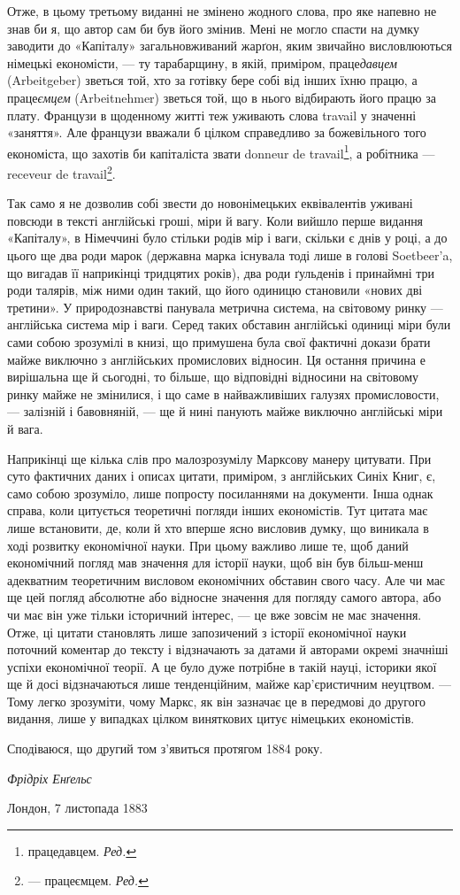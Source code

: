 Отже, в цьому третьому виданні не змінено жодного слова,
про яке напевно не знав би я, що автор сам би був його змінив.
Мені не могло спасти на думку заводити до «Капіталу» загальновживаний
жарґон, яким звичайно висловлюються німецькі економісти,
— ту тарабарщину, в якій, приміром, праце\emph{давцем} (Arbeitgeber)
зветься той, хто за готівку бере собі від інших їхню
працю, а праце\emph{ємцем} (Arbeitnehmer) зветься той, що в нього відбирають
його працю за плату. Французи в щоденному житті теж
уживають слова travail у значенні «заняття». Але французи
вважали б цілком справедливо за божевільного того економіста,
що захотів би капіталіста звати donneur de travail\footnote*{
працедавцем. \emph{Ред.}
}, а робітника —
receveur de travail\footnote*{ — працеємцем. \emph{Ред.}}.

Так само я не дозволив собі звести до новонімецьких еквівалентів
уживані повсюди в тексті англійські гроші, міри й вагу. Коли
вийшло перше видання «Капіталу», в Німеччині було стільки
родів мір і ваги, скільки є днів у році, а до цього ще два роди
марок (державна марка існувала тоді лише в голові Soetbeer’a, що
вигадав її наприкінці тридцятих років), два роди ґульденів і
принаймні три роди талярів, між ними один такий, що його одиницю
становили «нових дві третини». У природознавстві панувала
метрична система, на світовому ринку — англійська система мір
і ваги. Серед таких обставин англійські одиниці міри були сами
собою зрозумілі в книзі, що примушена була свої фактичні докази
брати майже виключно з англійських промислових відносин. Ця
остання причина е вирішальна ще й сьогодні, то більше, що відповідні
відносини на світовому ринку майже не змінилися, і що саме
в найважливіших галузях промисловости, — залізній і бавовняній,
— ще й нині панують майже виключно англійські міри й вага.

Наприкінці ще кілька слів про малозрозумілу Марксову
манеру цитувати. При суто фактичних даних і описах цитати,
приміром, з англійських Синіх Книг, є, само собою зрозуміло,
лише попросту посиланнями на документи. Інша однак справа,
коли цитується теоретичні погляди інших економістів. Тут цитата
має лише встановити, де, коли й хто вперше ясно висловив
думку, що виникала в ході розвитку економічної науки. При
цьому важливо лише те, щоб даний економічний погляд мав
значення для історії науки, щоб він був більш-менш адекватним
теоретичним висловом економічних обставин свого часу. Але
чи має ще цей погляд абсолютне або відносне значення для погляду
самого автора, або чи має він уже тільки історичний
інтерес, — це вже зовсім не має значення. Отже, ці цитати становлять
лише запозичений з історії економічної науки поточний
коментар до тексту і відзначають за датами й авторами окремі
значніші успіхи економічної теорії. А це було дуже потрібне в
такій науці, історики якої ще й досі відзначаються лише тенденційним,
майже кар’єристичним неуцтвом. — Тому легко зрозуміти,
чому Маркс, як він зазначає це в передмові до другого видання,
лише у випадках цілком виняткових цитує німецьких економістів.

Сподіваюся, що другий том з’явиться протягом 1884 року.

\begin{flushright}
\emph{Фрідріх Енґельс}
\end{flushright}

{\small Лондон, 7 листопада 1883~}
